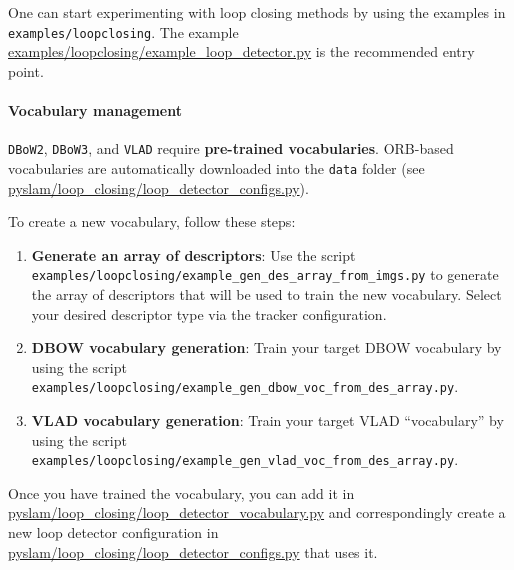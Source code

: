 \documentclass{article}
\let\oldparagraph\paragraph
\renewcommand{\paragraph}[1]{\oldparagraph{#1}\mbox{}}
\begin{document}
One can start experimenting with loop closing methods by using the
examples in \texttt{examples/loopclosing}. The example
\href{https://github.com/luigifreda/pyslam/blob/master/examples/loopclosing/example_loop_detector.py}{examples/loopclosing/example\_loop\_detector.py}
is the recommended entry point.

\hypertarget{vocabulary-management}{%
\paragraph{Vocabulary management}\label{vocabulary-management}}

\texttt{DBoW2}, \texttt{DBoW3}, and \texttt{VLAD} require
\textbf{pre-trained vocabularies}. ORB-based vocabularies are
automatically downloaded into the \texttt{data} folder (see
\href{https://github.com/luigifreda/pyslam/blob/master/pyslam/loop_closing/loop_detector_configs.py}{pyslam/loop\_closing/loop\_detector\_configs.py}).

To create a new vocabulary, follow these steps:

\begin{enumerate}
\def\labelenumi{\arabic{enumi}.}
\item
  \textbf{Generate an array of descriptors}: Use the script \\
  \texttt{examples/loopclosing/example\_gen\_des\_array\_from\_imgs.py} to
  generate the array of descriptors that will be used to train the new
  vocabulary. Select your desired descriptor type via the tracker
  configuration.
\item
  \textbf{DBOW vocabulary generation}: Train your target DBOW vocabulary
  by using the script
  \texttt{examples/loopclosing/example\_gen\_dbow\_voc\_from\_des\_array.py}.
\item
  \textbf{VLAD vocabulary generation}: Train your target VLAD
  ``vocabulary'' by using the script
  \texttt{examples/loopclosing/example\_gen\_vlad\_voc\_from\_des\_array.py}.
\end{enumerate}

Once you have trained the vocabulary, you can add it in
\href{https://github.com/luigifreda/pyslam/blob/master/pyslam/loop_closing/loop_detector_vocabulary.py}{pyslam/loop\_closing/loop\_detector\_vocabulary.py} and correspondingly
create a new loop detector configuration in
\href{https://github.com/luigifreda/pyslam/blob/master/pyslam/loop_closing/loop_detector_configs.py}{pyslam/loop\_closing/loop\_detector\_configs.py} that uses it.
\end{document}
